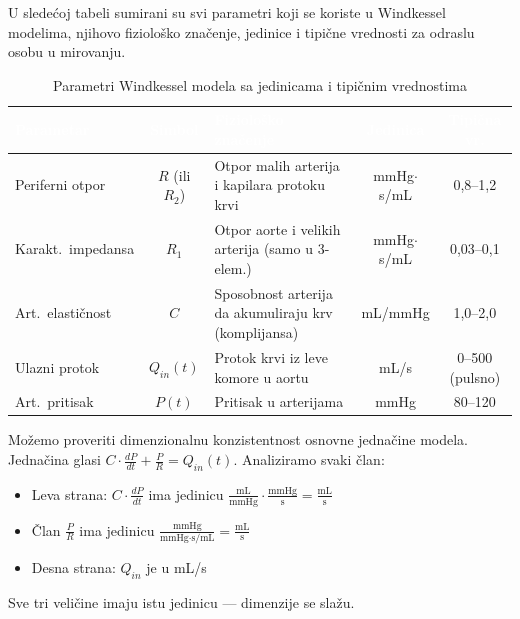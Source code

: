 \documentclass[12pt,a4paper]{article}
\begin{document}
U sledećoj tabeli sumirani su svi parametri koji se koriste u Windkessel modelima, njihovo fiziološko značenje, jedinice i tipične vrednosti za odraslu osobu u mirovanju.

\begin{table}[H]
    \centering
    \caption{Parametri Windkessel modela sa jedinicama i tipičnim vrednostima}
    \label{tab:parametri}
    \small
    \begin{tabular}{l c p{5cm} c c}
        \toprule
        \rowcolor{headerblue}
        \textcolor{white}{\textbf{Parametar}} & 
        \textcolor{white}{\textbf{Simbol}} & 
        \textcolor{white}{\textbf{Fiziološko značenje}} & 
        \textcolor{white}{\textbf{Jedinica}} & 
        \textcolor{white}{\textbf{Tipična vr.}} \\
        \midrule
        Periferni otpor & $R$ (ili $R_2$) & Otpor malih arterija i kapilara protoku krvi & mmHg$\cdot$s/mL & 0,8--1,2 \\
        \rowcolor{rowalt}
        Karakt.\ impedansa & $R_1$ & Otpor aorte i velikih arterija (samo u 3-elem.) & mmHg$\cdot$s/mL & 0,03--0,1 \\
        Art.\ elastičnost & $C$ & Sposobnost arterija da akumuliraju krv (komplijansa) & mL/mmHg & 1,0--2,0 \\
        \rowcolor{rowalt}
        Ulazni protok & $Q_{in}(t)$ & Protok krvi iz leve komore u aortu & mL/s & 0--500 (pulsno) \\
        Art.\ pritisak & $P(t)$ & Pritisak u arterijama & mmHg & 80--120 \\
        \bottomrule
    \end{tabular}
\end{table}

Možemo proveriti dimenzionalnu konzistentnost osnovne jednačine modela. Jednačina glasi $C \cdot \frac{dP}{dt} + \frac{P}{R} = Q_{in}(t)$. Analiziramo svaki član:
\begin{itemize}
    \item Leva strana: $C \cdot \frac{dP}{dt}$ ima jedinicu $\frac{\text{mL}}{\text{mmHg}} \cdot \frac{\text{mmHg}}{\text{s}} = \frac{\text{mL}}{\text{s}}$
    \item Član $\frac{P}{R}$ ima jedinicu $\frac{\text{mmHg}}{\text{mmHg} \cdot \text{s/mL}} = \frac{\text{mL}}{\text{s}}$
    \item Desna strana: $Q_{in}$ je u mL/s
\end{itemize}
Sve tri veličine imaju istu jedinicu --- dimenzije se slažu.
\end{document}
